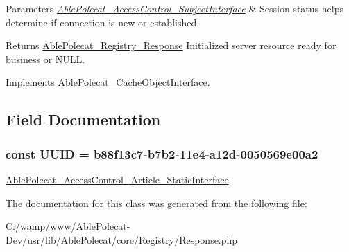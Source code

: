 \begin{DoxyParams}{Parameters}
{\em \hyperlink{interface_able_polecat___access_control___subject_interface}{Able\+Polecat\+\_\+\+Access\+Control\+\_\+\+Subject\+Interface}} & Session status helps determine if connection is new or established.\\
\hline
\end{DoxyParams}
\begin{DoxyReturn}{Returns}
\hyperlink{class_able_polecat___registry___response}{Able\+Polecat\+\_\+\+Registry\+\_\+\+Response} Initialized server resource ready for business or N\+U\+L\+L. 
\end{DoxyReturn}


Implements \hyperlink{interface_able_polecat___cache_object_interface_a3f2135f6ad45f51d075657f6d20db2cd}{Able\+Polecat\+\_\+\+Cache\+Object\+Interface}.



\subsection{Field Documentation}
\hypertarget{class_able_polecat___registry___response_a74b892c8c0b86bf9d04c5819898c51e7}{}
\subsubsection[{U\+U\+I\+D}]{\setlength{\rightskip}{0pt plus 5cm}const U\+U\+I\+D = \textquotesingle{}b88f13c7-\/b7b2-\/11e4-\/a12d-\/0050569e00a2\textquotesingle{}}\label{class_able_polecat___registry___response_a74b892c8c0b86bf9d04c5819898c51e7}
\hyperlink{interface_able_polecat___access_control___article___static_interface}{Able\+Polecat\+\_\+\+Access\+Control\+\_\+\+Article\+\_\+\+Static\+Interface} 

The documentation for this class was generated from the following file\+:\begin{DoxyCompactItemize}
\item 
C\+:/wamp/www/\+Able\+Polecat-\/\+Dev/usr/lib/\+Able\+Polecat/core/\+Registry/Response.\+php\end{DoxyCompactItemize}
